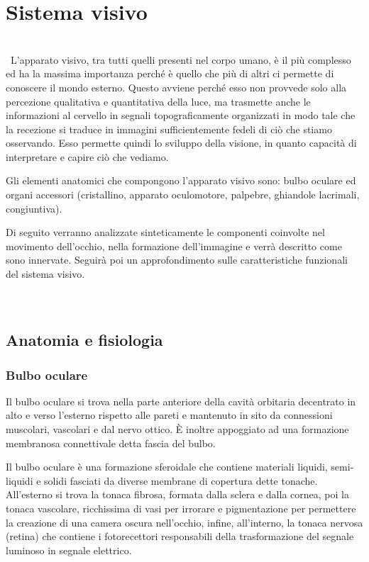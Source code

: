 
\chapter{Sistema visivo}
\\\
L’apparato visivo, tra tutti quelli presenti nel corpo umano, è il più complesso ed ha la massima importanza perché è quello che più di altri ci permette di conoscere il mondo esterno. Questo avviene perché esso non provvede solo alla percezione qualitativa e quantitativa della luce, ma trasmette anche le informazioni al cervello in segnali topograficamente organizzati in modo tale che la recezione si traduce in immagini sufficientemente fedeli di ciò che stiamo osservando. Esso permette quindi lo sviluppo della visione, in quanto capacità di interpretare e capire ciò che vediamo.

Gli elementi anatomici che compongono l’apparato visivo sono: bulbo oculare ed organi accessori (cristallino, apparato oculomotore, palpebre, ghiandole lacrimali, congiuntiva).

Di seguito verranno analizzate sinteticamente le componenti coinvolte nel movimento dell’occhio, nella formazione dell’immagine e verrà descritto come sono innervate. Seguirà  poi un approfondimento sulle caratteristiche funzionali del sistema visivo.
\\\ \\\
\section{Anatomia e fisiologia}

\subsection{Bulbo oculare}

Il bulbo oculare si trova nella parte anteriore della cavità orbitaria decentrato in alto e verso l’esterno rispetto alle pareti e mantenuto in sito da connessioni muscolari, vascolari e dal nervo ottico. È inoltre appoggiato ad una formazione membranosa connettivale detta fascia del bulbo. 

Il bulbo oculare è una formazione sferoidale che contiene materiali liquidi, semi-liquidi e solidi fasciati da diverse membrane di copertura dette tonache. All’esterno si trova la tonaca fibrosa, formata dalla sclera e dalla cornea, poi la tonaca vascolare, ricchissima di vasi per irrorare e pigmentazione per permettere la creazione di una camera oscura nell’occhio, infine, all’interno, la tonaca nervosa (retina) che contiene i fotorecettori responsabili della trasformazione del segnale luminoso in segnale elettrico.

